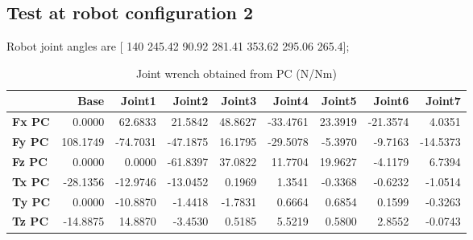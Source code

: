 
\subsection{Test at robot configuration 2}
Robot joint angles are  [ 140        245.42         90.92        281.41        353.62        295.06         265.4];

\begin{table}[h!]
	\centering
	\caption{Joint wrench obtained from PC (N/Nm)}
	\label{wrech_PC_Pose2}
	\begin{tabular}{|l|r|r|r|r|r|r|r|r|}
		\hline
		\textbf{}  & \textbf{Base} & \textbf{Joint1}  & \textbf{Joint2}  & \textbf{Joint3}  & \textbf{Joint4}  & \textbf{Joint5}  & \textbf{Joint6}  & \textbf{Joint7} \\ \hline
		\textbf{Fx PC}  & 0.0000        & 62.6833        & 21.5842        & 48.8627        & -33.4761        & 23.3919        & -21.3574        & 4.0351 \\ \hline
		\textbf{Fy PC}  & 108.1749        & -74.7031        & -47.1875        & 16.1795        & -29.5078        & -5.3970        & -9.7163        & -14.5373 \\ \hline
		\textbf{Fz PC}  & 0.0000        & 0.0000        & -61.8397        & 37.0822        & 11.7704        & 19.9627        & -4.1179        & 6.7394 \\ \hline
		\textbf{Tx PC}  & -28.1356        & -12.9746        & -13.0452        & 0.1969        & 1.3541        & -0.3368        & -0.6232        & -1.0514 \\ \hline
		\textbf{Ty PC}  & 0.0000        & -10.8870        & -1.4418        & -1.7831        & 0.6664        & 0.6854        & 0.1599        & -0.3263 \\ \hline
		\textbf{Tz PC}  & -14.8875        & 14.8870        & -3.4530        & 0.5185        & 5.5219        & 0.5800        & 2.8552        & -0.0743 \\ \hline
	\end{tabular}
\end{table}

